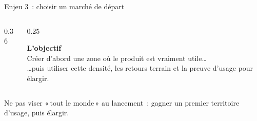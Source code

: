 \begin{frame}{Enjeu 3~: choisir un marché de départ}
\begin{columns}[T]
\begin{column}{0.36\textwidth}
    \end{column}
    \begin{column}{0.25\textwidth}
      \begin{idee}\footnotesize\centering
        {\sffamily\bfseries\color{insarouge}L'objectif}\\[3pt]
        Créer d'abord une zone où le produit est vraiment utile…\\[3pt]
        …puis utiliser cette densité, les retours terrain et la preuve d'usage pour élargir.
      \end{idee}
    \end{column}
  \end{columns}
  \vspace{0.05cm}
  \begin{pcompact}\centering\footnotesize
    Ne pas viser «\,tout le monde\,» au lancement~: gagner un premier territoire d'usage, puis élargir.
  \end{pcompact}
\end{frame}
